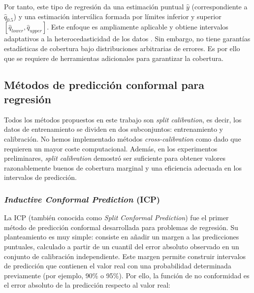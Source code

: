 Por tanto, este tipo de regresión da una estimación puntual $\hat{y}$ (correspondiente a $\hat{q}_{0.5}$) y una estimación interválica formada por límites inferior y superior $\left[ \hat{q}_{lower}, \hat{q}_{upper} \right]$. Este enfoque es ampliamente aplicable y obtiene intervalos adaptativos a la heterocedasticidad de los datos \cite{romano2019}. Sin embargo, no tiene garantías estadísticas de cobertura bajo distribuciones arbitrarias de errores. Es por ello que se requiere de herramientas adicionales para garantizar la cobertura.


\subsection{Métodos de predicción conformal para regresión}

Todos los métodos propuestos en este trabajo son \textit{split calibration}, es decir, los datos de entrenamiento se dividen en dos subconjuntos: entrenamiento y calibración. No hemos implementado métodos \textit{cross-calibration} como \cite{barber2021} dado que requieren un mayor coste computacional. Además, en los experimentos preliminares, \textit{split calibration} demostró ser suficiente para obtener valores razonablemente buenos de cobertura marginal y una eficiencia adecuada en los intervalos de predicción.


\subsubsection{\textit{Inductive Conformal Prediction} (ICP)}

La \acrshort{ICP} (también conocida como \textit{Split Conformal Prediction}) \cite{papadopoulos2002} fue el primer método de predicción conformal desarrollada para problemas de regresión. Su planteamiento es muy simple: consiste en añadir un margen a las predicciones puntuales, calculado a partir de un cuantil del error absoluto observado en un conjunto de calibración independiente. Este margen permite construir intervalos de predicción que contienen el valor real con una probabilidad determinada previamente (por ejemplo, 90\% o 95\%). 
Por ello, la función de no conformidad es el error absoluto de la predicción respecto al valor real:

